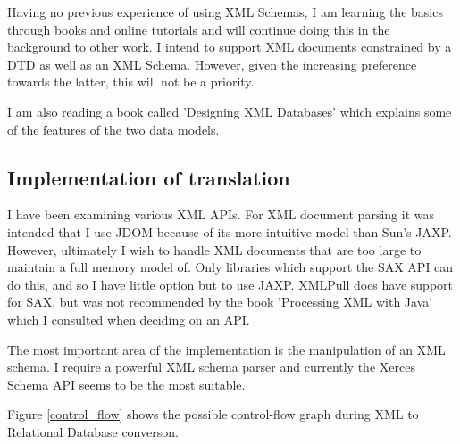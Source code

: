 \documentclass[a4paper]{article}
\begin{document}
Having no previous experience of using XML Schemas, I am learning the
basics
through books and online tutorials and will continue doing this in the 
background to other work. I intend to support XML documents constrained by 
a DTD as well as an XML Schema. However, given the increasing preference 
towards the latter, this will not be a priority.

I am also reading a book called 'Designing XML Databases' which explains some of the features of the two data models.

\subsection{Implementation of translation}

I have been examining various XML APIs. For XML document parsing it was intended that I use JDOM because of its more intuitive model than Sun's JAXP. However, ultimately I wish to handle XML documents that are too large to maintain a full memory model of. Only libraries which support the SAX API can do this, and so I have little option but to use JAXP. XMLPull does have support for SAX, but was not recommended by the book 'Processing XML with Java' which I consulted when deciding on an API.

The most important area of the implementation is the manipulation of an XML schema. I require a powerful XML schema parser and currently the Xerces Schema API seems to be the most suitable.

Figure \ref{control_flow} shows the possible control-flow graph during XML to Relational Database converson.
\end{document}
